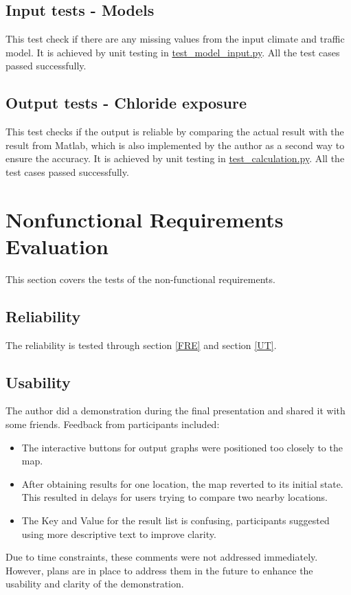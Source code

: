\documentclass[12pt, titlepage]{article}
\begin{document}
\subsection{Input tests - Models}
This test check if there are any missing values from the input climate and traffic model. It is achieved by unit testing in  \href{https://github.com/CynthiaLiu0805/BridgeCorrosion/blob/main/src/database/test_model_check.py}{test\_model\_input.py}. All the test cases passed successfully. 

\subsection{Output tests - Chloride exposure}
This test checks if the output is reliable by comparing the actual result with the result from Matlab, which is also implemented by the author as a second way to ensure the accuracy. It is achieved by unit testing in  \href{https://github.com/CynthiaLiu0805/BridgeCorrosion/blob/main/src/database/test_calculation.py}{test\_calculation.py}. All the test cases passed successfully. 

\section{Nonfunctional Requirements Evaluation}
This section covers the tests of the non-functional requirements. 
\subsection{Reliability}
The reliability is tested through section \ref{FRE} and section \ref{UT}.

\subsection{Usability}
The author did a demonstration during the final presentation and shared it with some friends. Feedback from participants included:
\begin{itemize}
\item The interactive buttons for output graphs were positioned too closely to the map.
\item After obtaining results for one location, the map reverted to its initial state. This resulted in delays for users trying to compare two nearby locations.
\item The Key and Value for the result list is confusing, participants suggested using more descriptive text to improve clarity.
\end{itemize}
Due to time constraints, these comments were not addressed immediately. However, plans are in place to address them in the future to enhance the usability and clarity of the demonstration.
\end{document}
